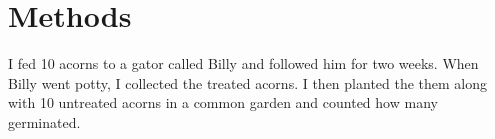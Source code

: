 \documentclass[../main.tex]{article}
\begin{document}
\section{Methods}

I fed 10 acorns to a gator called Billy and followed him for two weeks. When  Billy went potty, I collected the treated acorns. I then planted the them along with 10 untreated acorns in a common garden and counted how many germinated.
\end{document}
